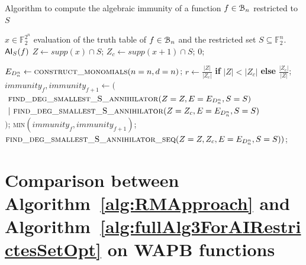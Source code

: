 \documentclass[11pt]{llncs}
\begin{document}
\begin{algorithm}
\small
    \caption{Algorithm to compute the algebraic immunity of a function $f\in \mathcal{B}_{n}$ restricted to $S$ } \label{alg:fullAlg3ForAIRestrictesSetOpt}
    \begin{algorithmic}[1]
        \Require $x\in \mathbb{F}_2^{2^n}$ evaluation of the truth table of $f\in \mathcal{B}_{n}$ and the restricted set $S\subseteq \mathbb{F}_2^n$.
		\Ensure $\mathsf{AI}_S(f)$
        \State
        \State $Z \gets supp(x)\cap S$;
        \State $Z_c \gets supp(x+1) \cap S$;
            \State \Return $0$;
        \EndIf
        \State

        \State $E_{D_n^n} \leftarrow \mbox{\textsc{construct\_monomials}}(n=n, d=n)$\footnotemark;
        \State $r\gets \frac{|Z|}{|Z_c|}$ \textbf{if} $|Z| < |Z_c|$ \textbf{else} $\frac{|Z_c|}{|Z|}$;
            \State $immunity_f, immunity_{f+1} \leftarrow ($\\
		$\ \mbox{\textsc{find\_deg\_smallest\_S\_annihilator}}(Z=Z, E=E_{D_n^n}, S=S)$\\
		$\ |\ \mbox{\textsc{find\_deg\_smallest\_S\_annihilator}}(Z=Z_c, E=E_{D_n^n}, S=S)$\\
		$)$;
            \State \Return \textsc{min}$\left(immunity_f, immunity_{f+1}\right)$;
        \Else
            \State \Return $\mbox{\textsc{find\_deg\_smallest\_S\_annihilator\_seq}}(Z=Z, Z_c, E=E_{D_n^n}, S=S))$\footnotemark;
        \EndIf
    \end{algorithmic}
\end{algorithm}


\section{Comparison between Algorithm~\ref{alg:RMApproach} and Algorithm~\ref{alg:fullAlg3ForAIRestrictesSetOpt} on WAPB functions}\label{appendix:algsComparison}
\end{document}
